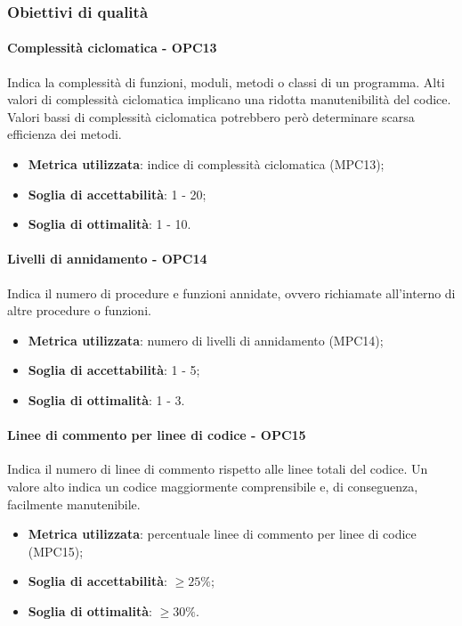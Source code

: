 \documentclass[PianoDiQualifica.tex]{subfiles}
\begin{document}
		\subsubsection{Obiettivi di qualità}
			\paragraph{Complessità ciclomatica - OPC13}
				Indica la complessità di funzioni, moduli, metodi o classi di un programma. Alti valori di complessità
				ciclomatica implicano una ridotta manutenibilità del codice. Valori bassi di complessità ciclomatica potrebbero
				però determinare scarsa efficienza dei metodi.
				\begin{itemize}
					\item \textbf{Metrica utilizzata}: indice di complessità ciclomatica (MPC13);
					\item \textbf{Soglia di accettabilità}: 1 - 20;
					\item \textbf{Soglia di ottimalità}: 1 - 10.
				\end{itemize}
			
			\paragraph{Livelli di annidamento - OPC14}
				Indica il numero di procedure e funzioni annidate, ovvero richiamate all'interno di altre procedure o funzioni.
				\begin{itemize}
					\item \textbf{Metrica utilizzata}: numero di livelli di annidamento (MPC14);
					\item \textbf{Soglia di accettabilità}: 1 - 5;
					\item \textbf{Soglia di ottimalità}: 1 - 3.
				\end{itemize}
			
			\paragraph{Linee di commento per linee di codice - OPC15}
				Indica il numero di linee di commento rispetto alle linee totali del codice. Un valore alto indica un codice maggiormente comprensibile
				e, di conseguenza, facilmente manutenibile.
				\begin{itemize}
					\item \textbf{Metrica utilizzata}: percentuale linee di commento per linee di codice (MPC15);
					\item \textbf{Soglia di accettabilità}: \begin{math} \geq 25\% \end{math};
					\item \textbf{Soglia di ottimalità}: \begin{math} \geq 30\% \end{math}.
				\end{itemize}
			
\end{document}
